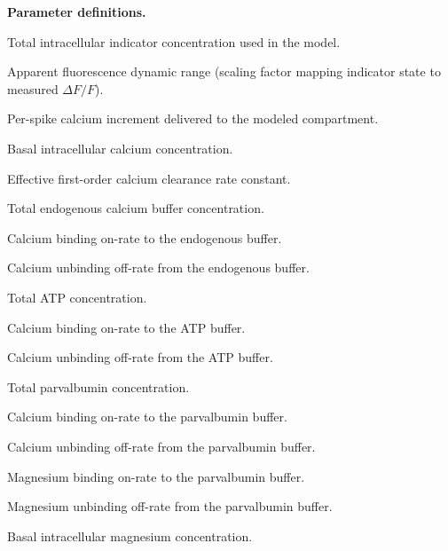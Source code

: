 \noindent\textbf{Parameter definitions.}
\begin{description}
\setlength{\itemsep}{0.25em}
\item[$\lbrack GCaMP\rbrack$] Total intracellular indicator concentration used in the model.
\item[$R_f$] Apparent fluorescence dynamic range (scaling factor mapping indicator state to measured $\Delta F/F$).
\item[$\Delta Ca_{spike}$] Per-spike calcium increment delivered to the modeled compartment.
\item[$ca_0$] Basal intracellular calcium concentration.
\item[$\gamma$] Effective first-order calcium clearance rate constant.
\item[$Buffer_{Endo}$] Total endogenous calcium buffer concentration.
\item[$k_{on, Endo}$] Calcium binding on-rate to the endogenous buffer.
\item[$k_{off, Endo}$] Calcium unbinding off-rate from the endogenous buffer.
\item[$\lbrack ATP\rbrack$] Total ATP concentration.
\item[$k_{on, ATP}$] Calcium binding on-rate to the ATP buffer.
\item[$k_{off, ATP}$] Calcium unbinding off-rate from the ATP buffer.
\item[$\lbrack Parv\rbrack$] Total parvalbumin concentration.
\item[$k_{on, Parv, Ca^{2+}}$] Calcium binding on-rate to the parvalbumin buffer.
\item[$k_{off, Parv, Ca^{2+}}$] Calcium unbinding off-rate from the parvalbumin buffer.
\item[$k_{on, Parv, Mg^{2+}}$] Magnesium binding on-rate to the parvalbumin buffer.
\item[$k_{off, Parv, Mg^{2+}}$] Magnesium unbinding off-rate from the parvalbumin buffer.
\item[$mg_0$] Basal intracellular magnesium concentration.
\end{description}

